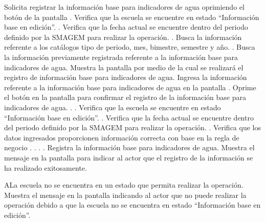 \begin{UCtrayectoria}
    \UCpaso[\UCactor] Solicita registrar la información base para indicadores de agua oprimiendo el botón \botEdit de la pantalla .
    \UCpaso[\UCsist] Verifica que la escuela se encuentre en estado ``Información base en edición''. .
    \UCpaso[\UCsist] Verifica que la fecha actual se encuentre dentro del periodo definido por la SMAGEM para realizar la operación. .
    \UCpaso[\UCsist] Busca la información referente a los catálogos tipo de periodo, mes, bimestre, semestre y año. .
    \UCpaso[\UCsist] Busca la información previamente registrada referente a la información base para indicadores de agua.
    \UCpaso[\UCsist] Muestra la pantalla  por medio de la cual se realizará el registro de información base para indicadores de agua.
    \UCpaso[\UCactor] Ingresa la información referente a la información base para indicadores de agua en la pantalla . \label{cuiba2:IngresarDatos}
    \UCpaso[\UCactor] Oprime el botón  en la pantalla  para confirmar el registro de la información base para indicadores de agua. . .    
     \UCpaso[\UCsist] Verifica que la escuela se encuentre en estado ``Información base en edición''. . \label{cuiba2:VerificarRegistro}
    \UCpaso[\UCsist] Verifica que la fecha actual se encuentre dentro del periodo definido por la SMAGEM para realizar la operación. .
    \UCpaso[\UCsist] Verifica que los datos ingresados proporcionen información correcta con base en la regla de negocio . . . . 
    \UCpaso[\UCsist] Registra la información base para indicadores de agua.
    \UCpaso[\UCsist] Muestra el mensaje  en la pantalla  para indicar al actor que el registro de la información se ha realizado exitosamente.    
 \end{UCtrayectoria}
 
   \begin{UCtrayectoriaA}{A}{La escuela no se encuentra en un estado que permita realizar la operación.}
    \UCpaso[\UCsist] Muestra el mensaje  en la pantalla  indicando al actor que no puede realizar la operación debido a que la escuela no se encuentra en estado ``Información base en edición''. 
 \end{UCtrayectoriaA}

